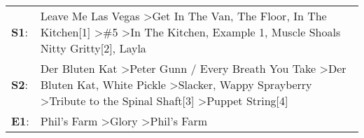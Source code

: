 \begin{supertabular}{p{0.03\textwidth}p{0.92\textwidth}}
 \textbf{S1}:  &                      Leave Me Las Vegas\textsuperscript{} \textgreater \enspace Get In The Van\textsuperscript{}, \enspace The Floor\textsuperscript{}, \enspace In The Kitchen[1]\textsuperscript{} \textgreater \enspace \#5\textsuperscript{} \textgreater \enspace In The Kitchen\textsuperscript{}, \enspace Example 1\textsuperscript{}, \enspace Muscle Shoals Nitty Gritty[2]\textsuperscript{}, \enspace Layla\textsuperscript{}  \enspace  \\
 \textbf{S2}:  &  Der Bluten Kat\textsuperscript{} \textgreater \enspace Peter Gunn / Every Breath You Take\textsuperscript{} \textgreater \enspace Der Bluten Kat\textsuperscript{}, \enspace White Pickle\textsuperscript{} \textgreater \enspace Slacker\textsuperscript{}, \enspace Wappy Sprayberry\textsuperscript{} \textgreater \enspace Tribute to the Spinal Shaft[3]\textsuperscript{} \textgreater \enspace Puppet String[4]\textsuperscript{}  \enspace  \\
 \textbf{E1}:  &                                                                                                                                                                                                                                                                                                           Phil's Farm\textsuperscript{} \textgreater \enspace Glory\textsuperscript{} \textgreater \enspace Phil's Farm\textsuperscript{}  \enspace  \\
\end{supertabular}
